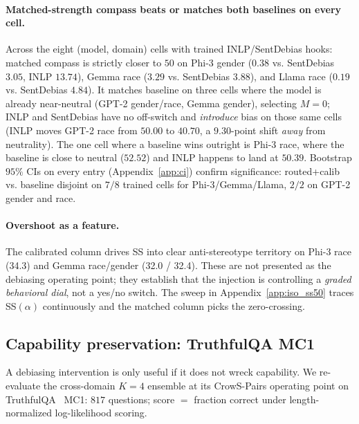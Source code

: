 \paragraph{Matched-strength compass beats or matches both baselines
on every cell.} Across the eight (model, domain) cells with trained
INLP/SentDebias hooks: matched compass is strictly closer to $50$ on
Phi-3 gender ($0.38$ vs. SentDebias $3.05$, INLP $13.74$), Gemma race
($3.29$ vs. SentDebias $3.88$), and Llama race
($0.19$ vs. SentDebias $4.84$). It matches baseline on three cells
where the model is already near-neutral (GPT-2 gender/race, Gemma
gender), selecting $M{=}0$; INLP and SentDebias have no off-switch
and \emph{introduce} bias on those same cells (INLP moves GPT-2 race
from $50.00$ to $40.70$, a $9.30$-point shift \emph{away} from
neutrality). The one cell where a baseline wins outright is Phi-3 race,
where the baseline is close to neutral ($52.52$) and INLP happens to
land at $50.39$. Bootstrap $95\%$ CIs on every entry
(Appendix~\ref{app:ci}) confirm significance: routed+calib vs.
baseline disjoint on $7/8$ trained cells for Phi-3/Gemma/Llama,
$2/2$ on GPT-2 gender and race.

\paragraph{Overshoot as a feature.} The calibrated column drives SS
into clear anti-stereotype territory on Phi-3 race (34.3) and Gemma
race/gender (32.0 / 32.4). These are not presented as the debiasing
operating point; they establish that the injection is controlling a
\emph{graded behavioral dial}, not a yes/no switch. The sweep in
Appendix~\ref{app:iso_ss50} traces SS$(\alpha)$ continuously and the
matched column picks the zero-crossing.

\subsection{Capability preservation: TruthfulQA MC1}
\label{sec:truthfulqa}

A debiasing intervention is only useful if it does not wreck
capability. We re-evaluate the cross-domain $K{=}4$ ensemble at its
CrowS-Pairs operating point on TruthfulQA~\citep{lin2022truthfulqa}
MC1: $817$ questions; score $=$ fraction correct under length-normalized
log-likelihood scoring.

